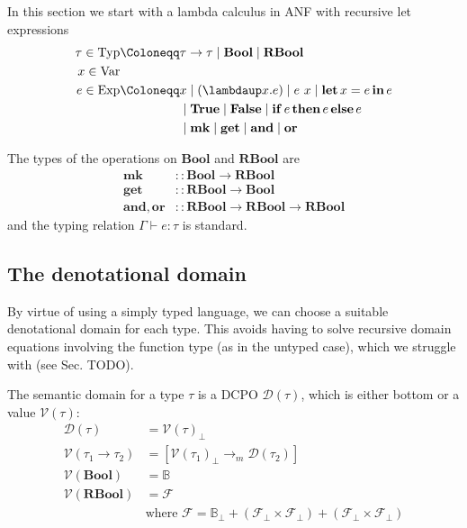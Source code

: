 \documentclass[manuscript,screen,acmsmall,nonacm]{acmart}
\newcommand{\syntax}[1]{\mathbf{#1}}
\newcommand{\Var}{\text{Var}}
\newcommand{\Exp}{\text{Exp}}
\newcommand{\Typ}{\text{Typ}}
\newcommand{\tBool}{\syntax{Bool}}
\newcommand{\tRBool}{\syntax{RBool}}
\newcommand{\slambda}{\syntax{\lambdaup}}
\newcommand{\sLet}[3]{\syntax{let}\,#1=#2\,\syntax{in}\,#3}
\newcommand{\sTrue}{\syntax{True}}
\newcommand{\sFalse}{\syntax{False}}
\newcommand{\sIf}[3]{\syntax{if}\,#1\,\syntax{then}\,#2\,\syntax{else}\,#3}
\newcommand{\sMk}{\syntax{mk}}
\newcommand{\sGet}{\syntax{get}}
\newcommand{\sAnd}{\syntax{and}}
\newcommand{\sOr}{\syntax{or}}
\newcommand{\dBool}{\mathbb B}
\newcommand{\dRBool}{\mathcal F}
\newcommand{\tV}[1]{\mathcal V(#1)}
\newcommand{\tD}[1]{\mathcal D(#1)}
\begin{document}
In this section we start with a lambda calculus in ANF with recursive let expressions
\begin{align*}
\tau \in \Typ &\Coloneqq \tau \to \tau \mid \tBool \mid \tRBool \\
x \in \Var & \\
e \in \Exp &\Coloneqq x \mid (\slambda x. e) \mid e~x \mid \sLet{x}{e}{e} \\
&\phantom{\Coloneqq}\mid \sTrue \mid \sFalse \mid \sIf{e}{e}{e} \\
&\phantom{\Coloneqq}\mid \sMk \mid \sGet \mid \sAnd \mid \sOr
\end{align*}

The types of the operations on $\tBool$ and $\tRBool$ are
\begin{align*}
\sMk &:: \tBool \to \tRBool \\
\sGet &:: \tRBool \to \tBool \\
\sAnd, \sOr &:: \tRBool \to \tRBool \to \tRBool
\end{align*}
and the typing relation $\Gamma \vdash e \colon \tau$ is standard.

\subsection{The denotational domain}

By virtue of using a simply typed language, we can choose a suitable denotational domain for each type. This avoids having to solve recursive domain equations involving the function type (as in the untyped case), which we struggle with (see Sec. TODO).

The semantic domain for a type $\tau$ is a DCPO $\tD\tau$, which is either bottom or a value $\tV\tau$:
\begin{align*}
\tD\tau &= \tV\tau_\bot \\
\tV{\tau_1 \to \tau_2} &= [\tV{\tau_1}_\bot \to_m \tD{\tau_2}] \\
\tV{\tBool} &= \dBool \\
\tV{\tRBool} &= \dRBool \\
&\text{where } \dRBool = \dBool_\bot + (\dRBool_\bot \times \dRBool_\bot) + (\dRBool_\bot \times \dRBool_\bot)
\end{align*}
\end{document}
